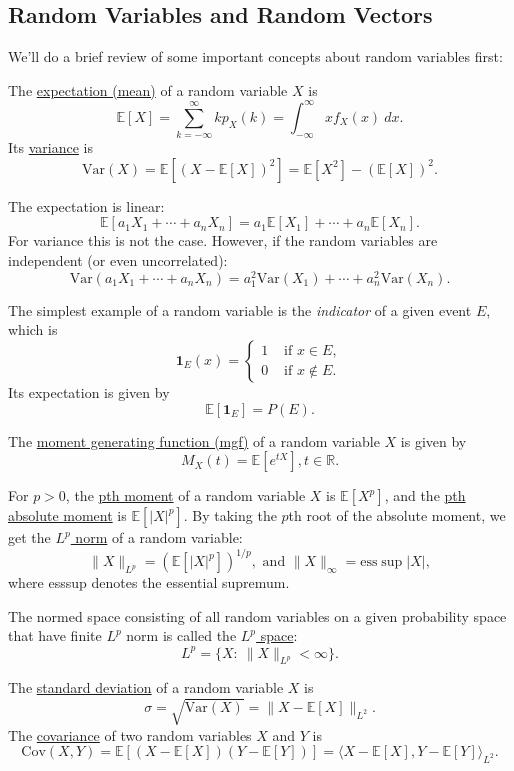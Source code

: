 \subsection{Random Variables and Random Vectors}

We'll do a brief review of some important concepts about random variables first:

The \underline{expectation (mean)} of a random variable $X$ is 
\[ \mathbb{E}[X] = \sum_{k = -\infty}^{\infty} k p_X(k) = \int_{-\infty}^{\infty} x f_X(x) \ dx. \]
Its \underline{variance} is 
\[ \mathrm{Var}(X) = \mathbb{E}[(X - \mathbb{E}[X])^2] = \mathbb{E}[X^2] - (\mathbb{E}[X])^2. \]

The expectation is linear: 
\[ \mathbb{E}[a_1 X_1 + \cdots + a_n X_n] = a_1 \mathbb{E}[X_1] + \cdots + a_n \mathbb{E}[X_n]. \]
For variance this is not the case. However, if the random variables are independent (or even uncorrelated): 
\[ \mathrm{Var}(a_1 X_1 + \cdots + a_n X_n) = a_1^2 \mathrm{Var}(X_1) + \cdots + a_n^2 \mathrm{Var}(X_n). \]

The simplest example of a random variable is the \textit{indicator} of a given event $E$, which is 
\[ \mathbf{1}_E(x) = \begin{cases}
	1 & \text{ if } x \in E, \\
	0 & \text{ if } x \notin E.
\end{cases} \]
Its expectation is given by 
\[ \mathbb{E}[\mathbf{1}_E] = P(E). \]

The \underline{moment generating function (mgf)} of a random variable $X$ is given by 
\[ M_X(t) = \mathbb{E}[e^{tX}], t \in \mathbb{R}. \]

For $p > 0$, the \underline{pth moment} of a random variable $X$ is $\mathbb{E}[X^p]$, and the 
\underline{pth absolute moment} is $\mathbb{E}[|X|^p]$. By taking the $p$th root of the absolute moment, 
we get the \underline{$L^p$ norm} of a random variable: 
\[ \lVert X \rVert_{L^p} = (\mathbb{E}[|X|^p])^{1/p}, \text{ and } 
\lVert X \rVert_{\infty} = \text{ess} \sup |X|, \]
where esssup denotes the essential supremum. 

The normed space consisting of all random variables on a given probability space that have finite 
$L^p$ norm is called the \underline{$L^p$ space}:
\[ L^p = \{ X: \ \lVert X \rVert_{L^p} < \infty \}. \]

The \underline{standard deviation} of a random variable $X$ is 
\[ \sigma = \sqrt{\mathrm{Var}(X)} = \lVert X - \mathbb{E}[X] \rVert_{L^2}. \]
The \underline{covariance} of two random variables $X$ and $Y$ is 
\[ \mathrm{Cov}(X, Y) = \mathbb{E}[(X - \mathbb{E}[X])(Y - \mathbb{E}[Y])] 
= \langle X - \mathbb{E}[X], Y - \mathbb{E}[Y] \rangle_{L^2}. \]


